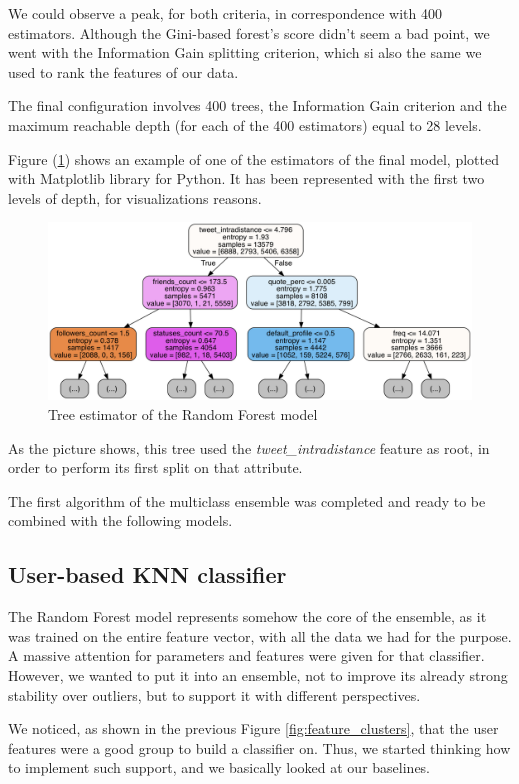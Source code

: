 We could observe a peak, for both criteria, in correspondence with 400 estimators.
Although the Gini-based forest's score didn't seem a bad point, we went with the Information Gain splitting criterion, which si also the same we used to rank the features of our data.

The final configuration involves 400 trees, the Information Gain criterion and the maximum reachable depth (for each of the 400 estimators) equal to 28 levels.

Figure (\ref{fig:tree}) shows an example of one of the estimators of the final model, plotted with Matplotlib library for Python. It has been represented with the first two levels of depth, for visualizations reasons.

\begin{figure}[htp!]
	\centering
	\includegraphics[width=\columnwidth]{chapter5/figure/tree.png}
	\caption{Tree estimator of the Random Forest model}
	\label{fig:tree}
\end{figure}

As the picture shows, this tree used the \textit{tweet\_intradistance} feature as root, in order to perform its first split on that attribute.

The first algorithm of the multiclass ensemble was completed and ready to be combined with the following models.

\subsection{User-based KNN classifier}
The Random Forest model represents somehow the core of the ensemble, as it was trained on the entire feature vector, with all the data we had for the purpose. A massive attention for parameters and features were given for that classifier. 
However, we wanted to put it into an ensemble, not to improve its already strong stability over outliers, but to support it with different perspectives.

We noticed, as shown in the previous Figure \ref{fig:feature_clusters}, that the user features were a good group to build a classifier on. Thus, we started thinking how to implement such support, and we basically looked at our baselines.

